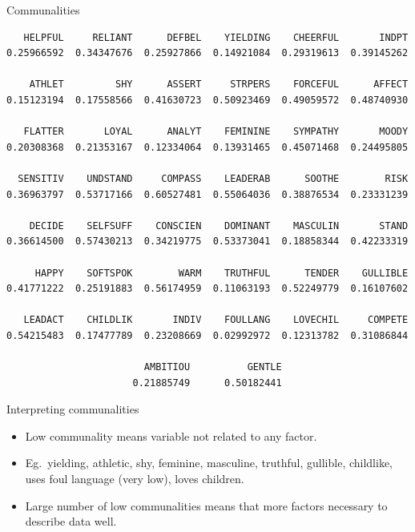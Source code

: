\documentclass[pdf]{prosper}
\begin{document}
\begin{slide}{Communalities}

{\scriptsize
\begin{verbatim}
   HELPFUL     RELIANT      DEFBEL    YIELDING    CHEERFUL       INDPT
0.25966592  0.34347676  0.25927866  0.14921084  0.29319613  0.39145262

    ATHLET         SHY      ASSERT     STRPERS    FORCEFUL      AFFECT
0.15123194  0.17558566  0.41630723  0.50923469  0.49059572  0.48740930

   FLATTER       LOYAL      ANALYT    FEMININE    SYMPATHY       MOODY
0.20308368  0.21353167  0.12334064  0.13931465  0.45071468  0.24495805

  SENSITIV    UNDSTAND     COMPASS    LEADERAB      SOOTHE        RISK
0.36963797  0.53717166  0.60527481  0.55064036  0.38876534  0.23331239

    DECIDE    SELFSUFF    CONSCIEN    DOMINANT    MASCULIN       STAND
0.36614500  0.57430213  0.34219775  0.53373041  0.18858344  0.42233319

     HAPPY    SOFTSPOK        WARM    TRUTHFUL      TENDER    GULLIBLE
0.41771222  0.25191883  0.56174959  0.11063193  0.52249779  0.16107602

   LEADACT    CHILDLIK       INDIV    FOULLANG    LOVECHIL     COMPETE
0.54215483  0.17477789  0.23208669  0.02992972  0.12313782  0.31086844

                        AMBITIOU          GENTLE
                      0.21885749      0.50182441
\end{verbatim}

}
  
\end{slide}

\begin{slide}{Interpreting communalities}

  \begin{itemize}
  \item Low communality means variable not related to any factor.
  \item Eg.\ yielding, athletic, shy, feminine, masculine, truthful, gullible, childlike, uses foul language (very low), loves children.
  \item Large number of low communalities means that more factors necessary to describe data well.
  \end{itemize}
  
\end{slide}
\end{document}
